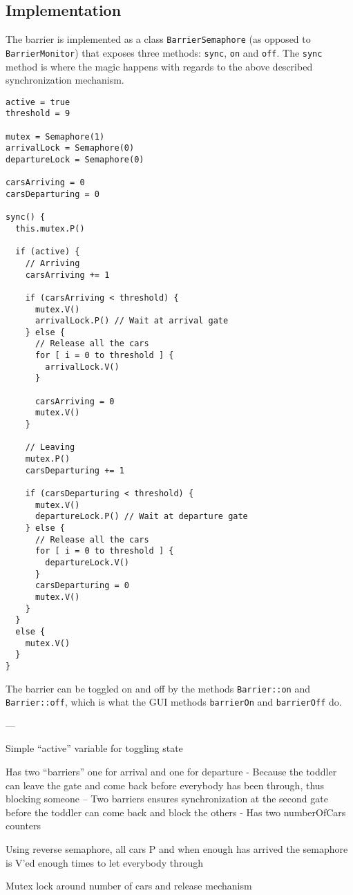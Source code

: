 \subsection*{Implementation}
The barrier is implemented as a class \texttt{BarrierSemaphore} (as opposed to \texttt{BarrierMonitor}) that exposes three methods: \texttt{sync}, \texttt{on} and \texttt{off}. The \texttt{sync} method is where the magic happens with regards to the above described synchronization mechanism.

\begin{lstlisting}
active = true
threshold = 9

mutex = Semaphore(1)
arrivalLock = Semaphore(0)
departureLock = Semaphore(0)

carsArriving = 0
carsDeparturing = 0

sync() {
  this.mutex.P()

  if (active) {
    // Arriving
    carsArriving += 1

    if (carsArriving < threshold) {
      mutex.V()
      arrivalLock.P() // Wait at arrival gate
    } else {
      // Release all the cars
      for [ i = 0 to threshold ] {
        arrivalLock.V()
      }

      carsArriving = 0
      mutex.V()
    }

    // Leaving
    mutex.P()
    carsDeparturing += 1

    if (carsDeparturing < threshold) {
      mutex.V()
      departureLock.P() // Wait at departure gate
    } else {
      // Release all the cars
      for [ i = 0 to threshold ] {
        departureLock.V()
      }
      carsDeparturing = 0
      mutex.V()
    }
  }
  else {
    mutex.V()
  }
}
\end{lstlisting}


The barrier can be toggled on and off by the methods \texttt{Barrier::on} and \texttt{Barrier::off}, which is what the GUI methods \texttt{barrierOn} and \texttt{barrierOff} do.


---


Simple ``active'' variable for toggling state

Has two ``barriers'' one for arrival and one for departure
- Because the toddler can leave the gate and come back before everybody has been through, thus blocking someone
-- Two barriers ensures synchronization at the second gate before the toddler can come back and block the others
- Has two numberOfCars counters

Using reverse semaphore, all cars P and when enough has arrived the semaphore is V'ed enough times to let everybody through

Mutex lock around number of cars and release mechanism




